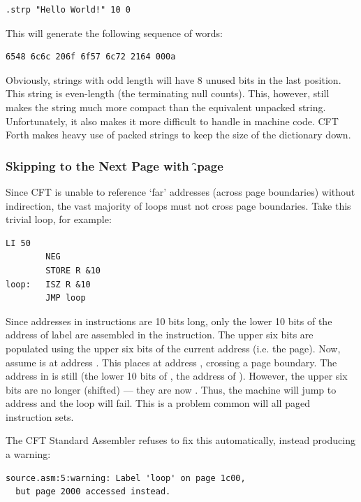 \begin{lstlisting}[language=cftasm,numbers=none]
.strp "Hello World!" 10 0
\end{lstlisting}

This will generate the following sequence of words:

\begin{lstlisting}[numbers=none]
6548 6c6c 206f 6f57 6c72 2164 000a
\end{lstlisting}

Obviously, strings with odd length will have 8 unused bits in the last
position. This string is even-length (the terminating null counts). This,
however, still makes the string much more compact than the equivalent unpacked
string. Unfortunately, it also makes it more difficult to handle in machine
code. CFT Forth makes heavy use of packed strings to keep the size of the
dictionary down.



\subsubsection{Skipping to the Next Page with \f{.page}}

Since CFT is unable to reference ‘far’ addresses (across page boundaries)
without indirection, the vast majority of loops must not cross page
boundaries. Take this trivial loop, for example:

\begin{lstlisting}[language=cftasm]
        LI 50
        NEG
        STORE R &10
loop:   ISZ R &10
        JMP loop
\end{lstlisting}

Since addresses in instructions are 10 bits long, only the lower 10 bits of the
address of label  are assembled in the  instruction. The upper
six bits are populated using the upper six bits of the current address
(i.e. the page). Now, assume  is at address . This places
 at address , crossing a page boundary. The address in
 is still  (the lower 10 bits of , the address of
). However, the upper six bits are no longer  (shifted) —
they are now . Thus, the machine will jump to address  and
the loop will fail. This is a problem common will all paged instruction sets.

The CFT Standard Assembler refuses to fix this automatically, instead producing a warning:

\begin{lstlisting}[numbers=none]
source.asm:5:warning: Label 'loop' on page 1c00,
  but page 2000 accessed instead.
\end{lstlisting}

